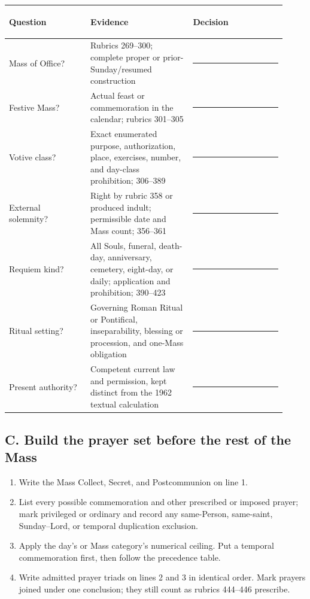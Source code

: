 \begin{longtable}{>{\bfseries\raggedright\arraybackslash}p{0.27\linewidth}>{\raggedright\arraybackslash}p{0.34\linewidth}>{\raggedright\arraybackslash}p{0.31\linewidth}}
\toprule
Question & Evidence & Decision\\
\midrule
\endhead
Mass of Office? & Rubrics 269--300; complete proper or prior-Sunday/resumed construction & \rule{0.28\linewidth}{0.4pt}\\
Festive Mass? & Actual feast or commemoration in the calendar; rubrics 301--305 & \rule{0.28\linewidth}{0.4pt}\\
Votive class? & Exact enumerated purpose, authorization, place, exercises, number, and day-class prohibition; 306--389 & \rule{0.28\linewidth}{0.4pt}\\
External solemnity? & Right by rubric 358 or produced indult; permissible date and Mass count; 356--361 & \rule{0.28\linewidth}{0.4pt}\\
Requiem kind? & All Souls, funeral, death-day, anniversary, cemetery, eight-day, or daily; application and prohibition; 390--423 & \rule{0.28\linewidth}{0.4pt}\\
Ritual setting? & Governing Roman Ritual or Pontifical, inseparability, blessing or procession, and one-Mass obligation & \rule{0.28\linewidth}{0.4pt}\\
Present authority? & Competent current law and permission, kept distinct from the 1962 textual calculation & \rule{0.28\linewidth}{0.4pt}\\
\bottomrule
\end{longtable}

\subsection{C. Build the prayer set before the rest of the Mass}

\begin{enumerate}[leftmargin=1.45em]
\item Write the Mass Collect, Secret, and Postcommunion on line 1.
\item List every possible commemoration and other prescribed or imposed prayer; mark privileged or ordinary and record any same-Person, same-saint, Sunday--Lord, or temporal duplication exclusion.
\item Apply the day's or Mass category's numerical ceiling.  Put a temporal commemoration first, then follow the precedence table.
\item Write admitted prayer triads on lines 2 and 3 in identical order.  Mark prayers joined under one conclusion; they still count as rubrics 444--446 prescribe.
\end{enumerate}

